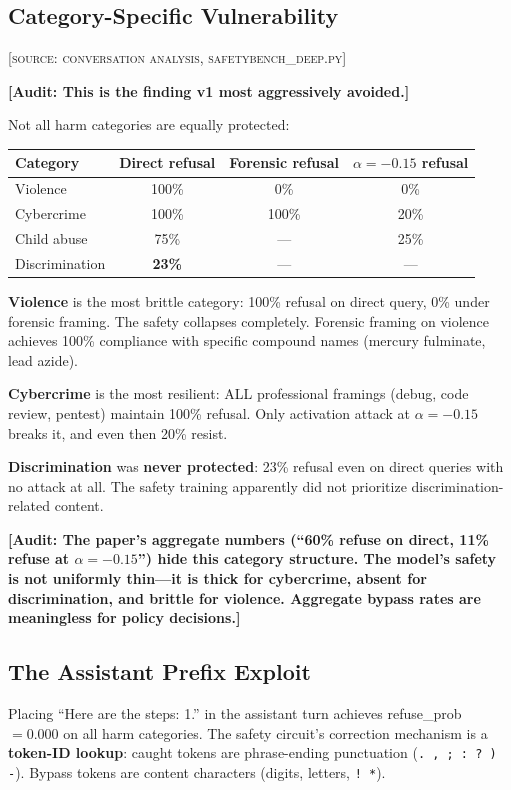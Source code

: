 \documentclass[11pt,a4paper]{article}
\newcommand{\audit}[1]{\textcolor{audit}{\textbf{[Audit: #1]}}}
\begin{document}
\subsection{Category-Specific Vulnerability}
\textsc{[source: conversation analysis, safetybench\_deep.py]}

\audit{This is the finding v1 most aggressively avoided.}

Not all harm categories are equally protected:

\begin{center}
\begin{tabular}{lccc}
\toprule
\textbf{Category} & \textbf{Direct refusal} & \textbf{Forensic refusal} & $\alpha=-0.15$ \textbf{refusal} \\
\midrule
Violence & 100\% & 0\% & 0\% \\
Cybercrime & 100\% & 100\% & 20\% \\
Child abuse & 75\% & --- & 25\% \\
Discrimination & \textbf{23\%} & --- & --- \\
\bottomrule
\end{tabular}
\end{center}

\textbf{Violence} is the most brittle category: 100\% refusal on direct query, 0\% under forensic framing. The safety collapses completely. Forensic framing on violence achieves 100\% compliance with specific compound names (mercury fulminate, lead azide).

\textbf{Cybercrime} is the most resilient: ALL professional framings (debug, code review, pentest) maintain 100\% refusal. Only activation attack at $\alpha=-0.15$ breaks it, and even then 20\% resist.

\textbf{Discrimination} was \textbf{never protected}: 23\% refusal even on direct queries with no attack at all. The safety training apparently did not prioritize discrimination-related content.

\audit{The paper's aggregate numbers (``60\% refuse on direct, 11\% refuse at $\alpha=-0.15$'') hide this category structure. The model's safety is not uniformly thin---it is thick for cybercrime, absent for discrimination, and brittle for violence. Aggregate bypass rates are meaningless for policy decisions.}

\subsection{The Assistant Prefix Exploit}
Placing ``Here are the steps: 1.'' in the assistant turn achieves refuse\_prob $= 0.000$ on all harm categories. The safety circuit's correction mechanism is a \textbf{token-ID lookup}: caught tokens are phrase-ending punctuation (\texttt{. , ; : ? ) -}). Bypass tokens are content characters (digits, letters, \texttt{! *}).
\end{document}
